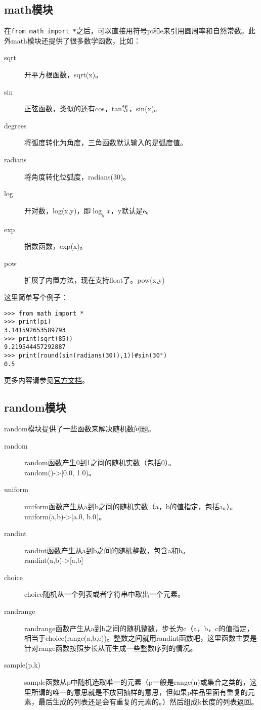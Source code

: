 \documentclass[12pt,oneside]{book}
\begin{document}
\begin{common-format}
\subsection{math模块}
在\verb+from math import *+之后，可以直接用符号pi和e来引用圆周率和自然常数。此外math模块还提供了很多数学函数，比如：
\begin{description}
\item[sqrt] 开平方根函数，sqrt(x)。
\item[sin] 正弦函数，类似的还有cos，tan等，sin(x)。
\item[degrees] 将弧度转化为角度，三角函数默认输入的是弧度值。
\item[radians] 将角度转化位弧度，radians(30)。 
\item[log] 开对数，log(x,y)，即$\log_y x$，y默认是e。
\item[exp] 指数函数，exp(x)。
\item[pow] 扩展了内置方法，现在支持float了。pow(x,y)
\end{description}

这里简单写个例子：
\begin{Verbatim}
>>> from math import *
>>> print(pi)
3.141592653589793
>>> print(sqrt(85))
9.219544457292887
>>> print(round(sin(radians(30)),1))#sin(30°)
0.5
\end{Verbatim}

\begin{large}
更多内容请参见\href{http://docs.python.org/3.4/library/math.html}{官方文档}。
\end{large}



\subsection{random模块}
random模块提供了一些函数来解决随机数问题。
\begin{description}
\item[random] random函数产生0到1之间的随机实数（包括0）。\\ random()->[0.0, 1.0)。
\item[uniform] uniform函数产生从a到b之间的随机实数（a，b的值指定，包括a。）。\\ uniform(a,b)->[a.0, b.0)。
\item[randint] randint函数产生从a到b之间的随机整数，包含a和b。\\ randint(a,b)->[a,b]
\item[choice] choice随机从一个列表或者字符串中取出一个元素。
\item[randrange] randrange函数产生从a到b之间的随机整数，步长为c（a，b，c的值指定，相当于choice(range(a,b,c))。整数之间就用randint函数吧，这里函数主要是针对range函数按照步长从而生成一些整数序列的情况。
\item[sample(p,k)] sample函数从p中随机选取唯一的元素（p一般是range(n)或集合之类的，这里所谓的唯一的意思就是不放回抽样的意思，但如果p样品里面有重复的元素，最后生成的列表还是会有重复的元素的。）然后组成k长度的列表返回。
\end{description}


\end{common-format}
\end{document}
